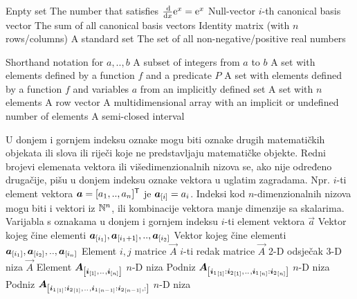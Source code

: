 	{Enpty set}
	{The number that satisfies $\od{}{x}\const e^x=\const e^x$}
	{Null-vector}
	{$i$-th canonical basis vector}
	{The sum of all canonical basis vectors}
	{Identity matrix (with $n$ rows/columns)}
	{A standard set}
	{The set of all non-negative/positive real numbers}

	{Shorthand notation for $a,..,b$}
	{A subset of integers from $a$ to $b$}
	{A set with elements defined by a function $f$ and a predicate $P$}
	{A set with elements defined by a function $f$ and variables $a$ from an implicitly defined set}
	{A set with $n$ elements}
	{A row vector}
	{A multidimensional array with an implicit or undefined number of elements}
	{A semi-closed interval}

{U donjem i gornjem indeksu oznake mogu biti oznake drugih matematičkih objekata ili slova ili riječi koje ne predstavljaju matematičke objekte. Redni brojevi elemenata vektora ili višedimenzionalnih nizova se, ako nije određeno drugačije, pišu u donjem indeksu oznake vektora u uglatim zagradama. Npr. $i$-ti element vektora $\vec a=\sbr{a_1,.., a_n}^\tp$ je $\vec a_\ind{i}=a_i$. Indeksi kod $n$-dimenzionalnih nizova mogu biti i vektori iz $\mathbb{N}^{n}$, ili kombinacije vektora manje dimenzije sa skalarima.}
	{Varijabla s oznakama u donjem i gornjem indeksu}
	{$i$-ti element vektora $\vec{a}$}
	{Vektor kojeg čine elementi $\vec{a}_\ind{i_1}, \vec{a}_\ind{i_1+1},.., \vec{a}_{\sbr{i_2}}$}
	{Vektor kojeg čine elementi $\vec{a}_\ind{i_1}, \vec{a}_\ind{i_2},.., \vec{a}_{\sbr{i_n}}$}
	{Element $i,j$ matrice $\vec A$}
	{$i$-ti redak matrice $\vec A$}
	{2-D odsječak 3-D niza $\vec A$}
	{Element $\vec{A}_\ind{\vec i_\ind{1},\bidot,\vec i_\ind{n}}$ $n$-D niza}
	{Podniz $\vec{A}_\ind{{\vec i_1}_\ind{1}:{\vec i_2}_\ind{1},\bidot,{\vec i_1}_\ind{n}:{\vec i_2}_\ind{n}}$ $n$-D niza}
	{Podniz $\vec{A}_\ind{{\vec i_1}_\ind{1}:{\vec i_2}_\ind{1},\bidot,{\vec i_1}_\ind{n-1}:{\vec i_2}_\ind{n-1},:}$ $n$-D niza}


